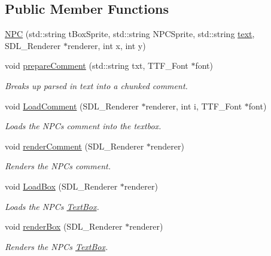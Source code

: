 \subsection*{Public Member Functions}
\begin{DoxyCompactItemize}
\item 
\hyperlink{class_n_p_c_a9db0a86ef6a5ab2b406c46c8ec6d740a}{N\+PC} (std\+::string t\+Box\+Sprite, std\+::string N\+P\+C\+Sprite, std\+::string \hyperlink{class_n_p_c_a64ad332dcfeb84a7a6bedd404378f05b}{text}, S\+D\+L\+\_\+\+Renderer $\ast$renderer, int x, int y)
\item 
void \hyperlink{class_n_p_c_af0a849c937b7d765b2bec4d122a2b62c}{prepare\+Comment} (std\+::string txt, T\+T\+F\+\_\+\+Font $\ast$font)
\begin{DoxyCompactList}\small\item\em Breaks up parsed in text into a chunked comment. \end{DoxyCompactList}\item 
void \hyperlink{class_n_p_c_a468647f008c7e65f2a25be9dcd5e5968}{Load\+Comment} (S\+D\+L\+\_\+\+Renderer $\ast$renderer, int i, T\+T\+F\+\_\+\+Font $\ast$font)
\begin{DoxyCompactList}\small\item\em Loads the N\+P\+Cs comment into the textbox. \end{DoxyCompactList}\item 
void \hyperlink{class_n_p_c_abfad5a818584b5ee6fab0605873ae5c4}{render\+Comment} (S\+D\+L\+\_\+\+Renderer $\ast$renderer)
\begin{DoxyCompactList}\small\item\em Renders the N\+P\+Cs comment. \end{DoxyCompactList}\item 
void \hyperlink{class_n_p_c_aa9d97773d1a9b49e2a8dd5adaa23beff}{Load\+Box} (S\+D\+L\+\_\+\+Renderer $\ast$renderer)
\begin{DoxyCompactList}\small\item\em Loads the N\+P\+Cs \hyperlink{class_text_box}{Text\+Box}. \end{DoxyCompactList}\item 
void \hyperlink{class_n_p_c_ad5e9a664ceae6a920e63d34f2738b21d}{render\+Box} (S\+D\+L\+\_\+\+Renderer $\ast$renderer)
\begin{DoxyCompactList}\small\item\em Renders the N\+P\+Cs \hyperlink{class_text_box}{Text\+Box}. \end{DoxyCompactList}\item 

\end{DoxyCompactItemize}
